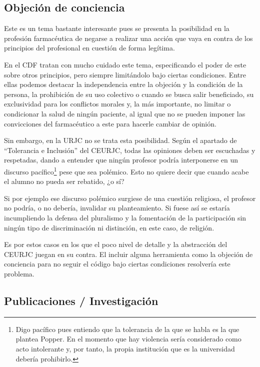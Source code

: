 \documentclass[11pt,a4paper]{article}
\begin{document}
\subsection{Objeción de conciencia}
Este es un tema bastante interesante pues se presenta la posibilidad en la profesión farmacéutica de negarse a realizar una acción que vaya en contra de los principios del profesional en cuestión de forma legítima.

En el CDF tratan con mucho cuidado este tema, especificando el poder de este sobre otros principios, pero siempre limitándolo bajo ciertas condiciones. Entre ellas podemos destacar la independencia entre la objeción y la condición de la persona, la prohibición de su uso colectivo o cuando se busca salir beneficiado, su exclusividad para los conflictos morales y, la más importante, no limitar o condicionar la salud de ningún paciente, al igual que no se pueden imponer las convicciones del farmacéutico a este para hacerle cambiar de opinión.

Sin embargo, en la URJC no se trata esta posibilidad. Según el apartado de “Tolerancia e Inclusión” del CEURJC, todas las opiniones deben ser escuchadas y respetadas, dando a entender que ningún profesor podría interponerse en un discurso pacífico\footnote{Digo pacífico pues entiendo que la tolerancia de la que se habla es la que plantea Popper. En el momento que hay violencia sería considerado como acto intolerante y, por tanto, la propia institución que es la universidad debería prohibirlo.} pese que sea polémico. Esto no quiere decir que cuando acabe el alumno no pueda ser rebatido, ¿o sí?

Si por ejemplo ese discurso polémico surgiese de una cuestión religiosa, el profesor no podría, o no debería, invalidar su planteamiento. Si fuese así se estaría incumpliendo la defensa del pluralismo y la fomentación de la participación sin ningún tipo de discriminación ni distinción, en este caso, de religión.

Es por estos casos en los que el poco nivel de detalle y la abstracción del CEURJC juegan en su contra. El incluir alguna herramienta como la objeción de conciencia para no seguir el código bajo ciertas condiciones resolvería este problema.


\subsection{Publicaciones / Investigación}
\end{document}
